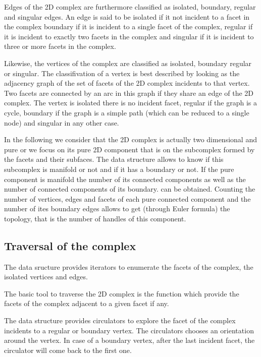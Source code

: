 Edges of the 2D complex  are furthermore  classified 
as isolated, boundary, regular and singular edges. An edge is said
to be  isolated if it not incident to a facet in the complex
boundary if it is incident to a single facet of the complex,
regular if it is incident to exactly two facets in the complex  and 
singular if it is incident to three or more facets in the complex.

Likewise, the vertices of the complex are classified as  isolated, boundary
regular or singular.  The classifivation of a vertex is best
described by looking  as the adjacency graph of the set 
of facets of the 2D complex
incidents to that vertex. 
Two facets are connected by an arc in this graph if
they share an edge of the 2D complex. The vertex is isolated
there is no incident facet, regular  if the graph is a cycle,
boundary if the graph is a simple path (which can be reduced to a
single node) and singular in any other case.

In the following we consider that the 2D complex is 
actually two dimensional and pure or we focus
on its pure 2D component 
that is on  the subcomplex formed by the facets and
their subfaces.
The data structure allows to know if this subcomplex is manifold or not
and if it has a boundary or not.  If the pure component is manifold
the number of its connected components as well
as the number of connected components of its boundary.
can be obtained. 
Counting the number of vertices, edges and
facets of each  pure connected component  and the number
of ites boundary edges allows to get
 (through Euler formula)
the  topology, that is the number of handles of this component.

 

\subsection{Traversal of the complex}
The data sructure provides iterators to enumerate 
the facets of the complex, the isolated vertices and edges.

The basic tool to traverse the 2D  complex is the 
function which provide the facets of the complex adjacent to  a given
facet if any.

The data structure provides circulators to explore the facet of the
complex incidents to a regular or boundary vertex. The circulators 
chooses an orientation around the vertex. In case of a boundary vertex,
after the last incident facet, the circulator will
come back to the first one.

